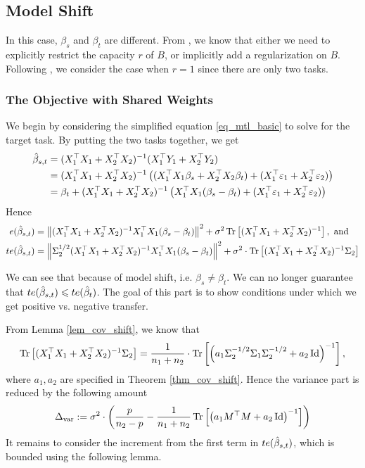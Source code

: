 \subsection{Model Shift}

In this case, $\beta_s$ and $\beta_t$ are different.
From \cite{WZR20}, we know that either we need to explicitly restrict the capacity $r$ of $B$, or implicitly add a regularization on $B$.
Following \cite{WZR20}, we consider the case when $r=1$ since there are only two tasks.

\subsubsection{The Objective with Shared Weights}

We begin by considering the simplified equation \eqref{eq_mtl_basic} to solve for the target task.
By putting the two tasks together, we get
\begin{align*}
	\hat{\beta}_{s,t} &= (X_1^{\top}X_1 + X_2^{\top}X_2)^{-1} (X_1^{\top}Y_1 + X_2^{\top}Y_2) \\
	&= (X_1^{\top}X_1 + X_2^{\top}X_2)^{-1} \left({(X_1^{\top}X_1\beta_s + X_2^{\top}X_2\beta_t) + (X_1^{\top}\varepsilon_1 + X_2^{\top}\varepsilon_2)}\right) \\
	&= \beta_t + (X_1^{\top}X_1 + X_2^{\top}X_2)^{-1}\left({X_1^{\top}X_1(\beta_s - \beta_t) + (X_1^{\top}\varepsilon_1 + X_2^{\top}\varepsilon_2)}\right)
\end{align*}
Hence
\begin{align}
	e(\hat{\beta}_{s,t})
	&= \left\| (X_1^{\top}X_1 + X_2^{\top}X_2)^{-1} X_1^{\top}X_1 (\beta_s - \beta_t) \right\|^2
	+ \sigma^2 \operatorname{Tr}\left[(X_1^{\top}X_1 + X_2^{\top}X_2)^{-1}\right], \text{ and} \\
	te(\hat{\beta}_{s,t})
	&= \left\| \Sigma_2^{1/2} (X_1^{\top}X_1 + X_2^{\top}X_2)^{-1} X_1^{\top}X_1 (\beta_s - \beta_t) \right\|^2 + \sigma^2\cdot \operatorname{Tr}\left[(X_1^{\top}X_1 + X_2^{\top}X_2)^{-1}\Sigma_2\right] \label{eq_te_model_shift}
\end{align}

We can see that because of model shift, i.e. $\beta_s \neq \beta_t$.
We can no longer guarantee that $te(\hat{\beta}_{s,t}) \leqslant te(\hat{\beta}_t)$.
The goal of this part is to show conditions under which we get positive vs. negative transfer.

 From Lemma \ref{lem_cov_shift}, we know that
\[ \operatorname{Tr}\left[(X_1^{\top}X_1 + X_2^{\top}X_2)^{-1} \Sigma_2\right] = \frac{1}{n_1 + n_2}\cdot \operatorname{Tr}\left[ \left({a_1\Sigma_2^{-1/2}\Sigma_1\Sigma_2^{-1/2} + a_2\operatorname{Id}}\right)^{-1}\right], \]
where $a_1, a_2$ are specified in Theorem \ref{thm_cov_shift}.
Hence the variance part is reduced by the following amount
\begin{align}
	\Delta_{\text{var}} := \sigma^2 \cdot \left({\frac{p}{n_2 - p} - \frac{1}{n_1 + n_2} \operatorname{Tr}\left[\left({a_1 M^{\top}M + a_2\operatorname{Id}}\right)^{-1}\right]}\right)
\end{align}
It remains to consider the increment from the first term in $te(\hat{\beta}_{s,t})$, which is bounded using the following lemma.


